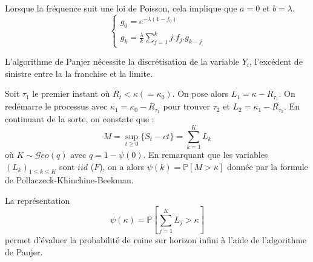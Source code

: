 \begin{f}
	Lorsque la fréquence suit une loi de Poisson, cela implique que {\color{OrangeProfondIRA} $a=0$ et $b=\lambda$.}
	$$
\begin{cases}
		g_0= e^{-\lambda (1-f_0)}
	\\
	g_k=\frac{\lambda}{k}\sum_{j=1}^k j . f_j  . g_{k-j}
\end{cases}	
$$
	
	L'algorithme de Panjer nécessite la discrétisation de la variable $Y_i$, l'excédent de sinistre entre la la franchise et la limite.
\end{f}

\begin{f}
	
	Soit $\tau_1$ le premier instant où $R_t<\kappa(=\kappa_0)$. On pose alors  $L_1=\kappa -R_{\tau_1}$.
	On redémarre le processus avec $\kappa_1=\kappa_0-R_{\tau_1}$ pour trouver  $\tau_2$ et $L_2=\kappa_1 -R_{\tau_2}$.
	En continuant de la sorte, on constate que :
	$$
	M=\sup_{t\geq 0}\{ S_t -ct \} =\sum_{k=1}^{K}L_k
	$$
	où $K\sim \mathcal{G}eo(q)$ avec $q=1-\psi(0)$.  
	En remarquant que les variables $\left(  L_k\right)_{1\leq k\leq K}$ sont $iid$ ($F$), on a alors $\psi(k)=\mathbb{P}[M>\kappa]$ donnée par la formule de Pollaczeck-Khinchine-Beekman.
	
	
	La représentation 
	$$
	\psi(\kappa)=\mathbb{P}\left[\sum_{j = 1}^{K}L_j>\kappa \right] 
	$$
	permet d'évaluer la probabilité de ruine sur horizon infini à l'aide de l'algorithme de Panjer.
	
\end{f}





